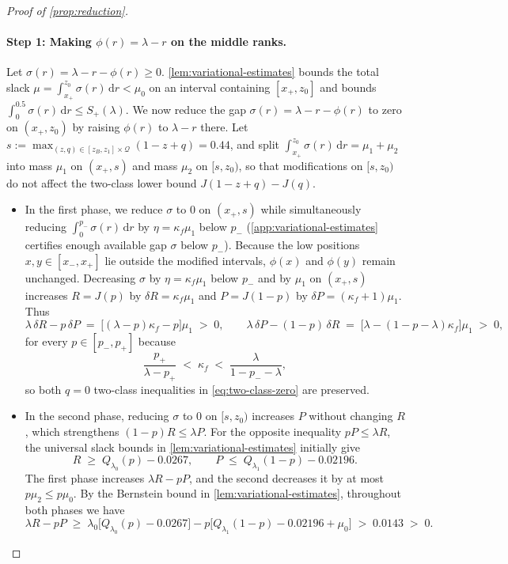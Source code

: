 \documentclass[11pt]{article}
\numberwithin{equation}{section}
\theoremstyle{plain}
\theoremstyle{definition}
\newcommand{\1}{\mathbf{1}}
\newcommand{\calQ}{\mathcal{Q}}
\begin{document}
\begin{proof}[Proof of {\cref{prop:reduction}}]
\paragraph{Step 1: Making $\phi(r) = \lambda - r$ on the middle ranks.}
Let $\sigma(r) = \lambda - r - \phi(r) \ge 0$. \cref{lem:variational-estimates} bounds the total slack $\mu = \int_{x_+}^{z_0} \sigma(r)\,\mathrm{d}r < \mu_0$ on an interval containing $[x_+, z_0]$ and bounds $\int_0^{0.5} \sigma(r)\,\mathrm{d}r \le S_+(\lambda)$. We now reduce the gap $\sigma(r) = \lambda - r - \phi(r)$ to zero on $(x_+, z_0)$ by raising $\phi(r)$ to $\lambda - r$ there. Let $s := \max_{(z, q) \in [z_B, z_1] \times \calQ}(1 - z + q) = 0.44$, and split $\int_{x_+}^{z_0} \sigma(r)\,\mathrm{d}r = \mu_1 + \mu_2$ into mass $\mu_1$ on $(x_+, s)$ and mass $\mu_2$ on $[s, z_0)$, so that modifications on $[s, z_0)$ do not affect the two-class lower bound $J(1 - z + q) - J(q)$.
\begin{itemize}
  \item In the first phase, we reduce $\sigma$ to $0$ on $(x_+, s)$ while simultaneously reducing $\int_0^{p_-} \sigma(r)\,\mathrm{d}r$ by $\eta = \kappa_f \mu_1$ below $p_-$ (\cref{app:variational-estimates} certifies enough available gap $\sigma$ below $p_-$). Because the low positions $x, y \in [x_-, x_+]$ lie outside the modified intervals, $\phi(x)$ and $\phi(y)$ remain unchanged. Decreasing $\sigma$ by $\eta = \kappa_f\mu_1$ below $p_-$ and by $\mu_1$ on $(x_+, s)$ increases $R = J(p)$ by $\delta R = \kappa_f\mu_1$ and $P = J(1 - p)$ by $\delta P = (\kappa_f + 1)\mu_1$. Thus
  \[
    \lambda\,\delta R - p\,\delta P \;=\; \bigl[(\lambda - p)\kappa_f - p\bigr]\mu_1 \;>\; 0,
    \qquad
    \lambda\,\delta P - (1 - p)\,\delta R \;=\; \bigl[\lambda - (1 - p - \lambda)\kappa_f\bigr]\mu_1 \;>\; 0,
  \]
  for every $p \in [p_-, p_+]$ because
  \[
    \frac{p_+}{\lambda - p_+} \;<\; \kappa_f \;<\; \frac{\lambda}{1 - p_- - \lambda},
  \]
  so both $q = 0$ two-class inequalities in \cref{eq:two-class-zero} are preserved.
  \item In the second phase, reducing $\sigma$ to $0$ on $[s, z_0)$ increases $P$ without changing $R$, which strengthens $(1 - p)R \le \lambda P$. For the opposite inequality $p P \le \lambda R$, the universal slack bounds in \cref{lem:variational-estimates} initially give
  \[
    R \;\ge\; Q_{\lambda_0}(p) - 0.0267,
    \qquad
    P \;\le\; Q_{\lambda_1}(1 - p) - 0.02196.
  \]
  The first phase increases $\lambda R - p P$, and the second decreases it by at most $p\mu_2 \le p\mu_0$. By the Bernstein bound in \cref{lem:variational-estimates}, throughout both phases we have
  \[
    \lambda R - p P \;\ge\; \lambda_0\bigl[Q_{\lambda_0}(p) - 0.0267\bigr] - p\bigl[Q_{\lambda_1}(1 - p) - 0.02196 + \mu_0\bigr] \;>\; 0.0143 \;>\; 0.
  \]
\end{itemize}


\end{proof}
\end{document}
